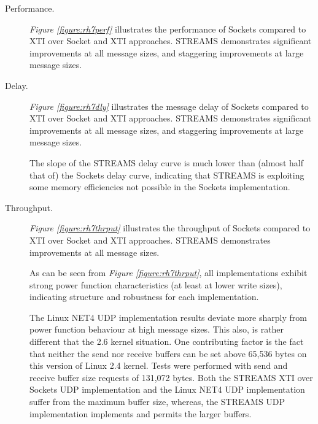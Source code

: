 \documentclass[letterpaper,final,notitlepage,twocolumn,10pt,twoside]{article}
\begin{document}
\begin{description}

\item[Performance.]

\textit{Figure \ref{figure:rh7perf}}
illustrates
the performance of Sockets compared to XTI over Socket and XTI approaches.
STREAMS demonstrates significant improvements at all message sizes, and
staggering improvements at large message sizes.

\item[Delay.]

\textit{Figure \ref{figure:rh7dly}}
illustrates
the message delay of Sockets compared to XTI over Socket and XTI approaches.
STREAMS demonstrates significant improvements at all message sizes, and
staggering improvements at large message sizes.

The slope of the STREAMS delay curve is much lower than (almost half that of)
the Sockets delay curve, indicating that STREAMS is exploiting some memory
efficiencies not possible in the Sockets implementation.


\item[Throughput.]

\textit{Figure \ref{figure:rh7thrput}}
illustrates the throughput of Sockets compared to XTI over Socket and XTI
approaches.  STREAMS demonstrates improvements at all message sizes.

As can be seen from \textit{Figure \ref{figure:rh7thrput}}, all
implementations exhibit strong power function characteristics (at least at
lower write sizes), indicating structure and robustness for each
implementation.

The Linux NET4 UDP implementation results deviate more sharply from power
function behaviour at high message sizes.  This also, is rather different that
the 2.6 kernel situation.  One contributing factor is the fact that neither
the send nor receive buffers can be set above 65,536 bytes on this version of
Linux 2.4 kernel.  Tests were performed with send and receive buffer size
requests of 131,072 bytes.  Both the STREAMS XTI over Sockets UDP
implementation and the Linux NET4 UDP implementation suffer from the maximum
buffer size, whereas, the STREAMS UDP implementation implements and permits
the larger buffers.


\end{description}
\end{document}
